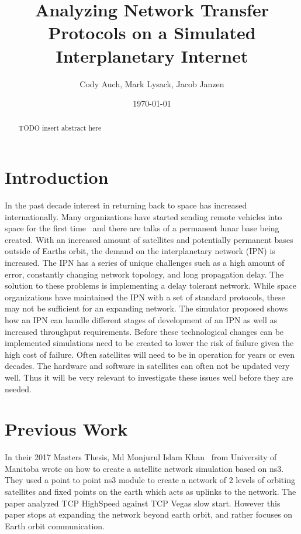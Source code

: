 \documentclass[a4paper,12pt]{article}
\title{Analyzing Network Transfer Protocols on a Simulated Interplanetary Internet}
\author{Cody Auch, Mark Lysack, Jacob Janzen}
\date{\today}
\begin{document}
\maketitle

\begin{abstract}
    TODO insert abstract here
\end{abstract}

\section{Introduction}

In the past decade interest in returning back to space has increased
internationally. Many organizations have started sending remote vehicles into
space for the first time~%
and there are talks of a permanent lunar base being created. With an increased
amount of satellites and potentially permanent bases outside of Earths orbit,
the demand on the interplanetary network (IPN) is increased. The IPN has a
series of unique challenges such as a high amount of error, constantly changing
network topology, and long propagation delay. The solution to these problems is
implementing a delay tolerant network. While space organizations have maintained
the IPN with a set of standard protocols, these may not be sufficient for an
expanding network. The simulator proposed shows how an IPN can handle different
stages of development of an IPN as well as increased throughput requirements.
Before these technological changes can be implemented simulations need to be
created to lower the risk of failure given the high cost of failure. Often
satellites will need to be in operation for years or even decades. The hardware
and software in satellites can often not be updated very well. Thus it will be
very relevant to investigate these issues well before they are needed.


\section{Previous Work}

In their 2017 Masters Thesis, Md Monjurul Islam Khan~\cite{Khan2017} from
University of Manitoba wrote on how to create a satellite network simulation
based on ns3. They used a point to point ns3 module to create a network of 2
levels of orbiting satellites and fixed points on the earth which acts as
uplinks to the network. The paper analyzed TCP HighSpeed against TCP Vegas slow
start. However this paper stops at expanding the network beyond earth orbit, and
rather focuses on Earth orbit communication.
\end{document}
